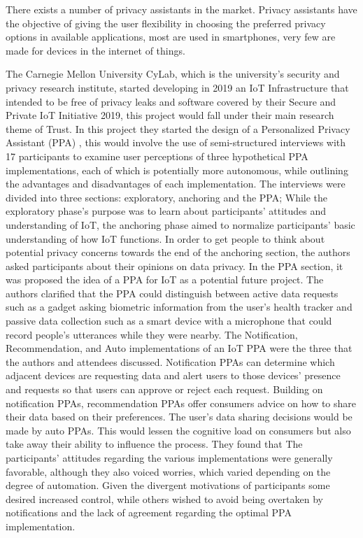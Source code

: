 \documentclass[conference]{IEEEtran}
\begin{document}
There exists a number of privacy assistants in the market. Privacy assistants
have the objective of giving the user flexibility in choosing the
preferred privacy options in available applications, most are used in
smartphones, very few are made for devices in the internet of things.

The Carnegie Mellon University CyLab, which is the university's security and
privacy research institute, started developing in 2019 an IoT Infrastructure
that intended to be free of privacy leaks and software covered by their
Secure and Private IoT Initiative 2019, this project would fall under their
main research theme of Trust. In this project they started the design of a
Personalized Privacy Assistant (PPA) \cite{ColnagoInforming}, this would involve the use of semi-structured
interviews with 17 participants to examine user perceptions of three hypothetical
PPA implementations, each of which is potentially more autonomous,
while outlining the advantages and disadvantages of each implementation.
The interviews were divided into three sections: exploratory, anchoring and the PPA;
While the exploratory phase's purpose was to learn about participants' attitudes
and understanding of IoT, the anchoring phase aimed to normalize participants' basic
understanding of how IoT functions. In order to get people to think about potential
privacy concerns towards the end of the anchoring section, the authors asked
participants about their opinions on data privacy. In the PPA section, it was proposed
the idea of a PPA for IoT as a potential future project. The authors clarified that
the PPA could distinguish between active data requests such as a gadget asking
biometric information from the user's health tracker and passive data collection
such as a smart device with a microphone that could record people's utterances
while they were nearby. The Notification, Recommendation, and Auto implementations
of an IoT PPA were the three that the authors and attendees discussed.
Notification PPAs can determine which adjacent devices are requesting data
and alert users to those devices' presence and requests so that users can
approve or reject each request.
Building on notification PPAs, recommendation PPAs offer consumers advice
on how to share their data based on their preferences.
The user's data sharing decisions would be made by auto PPAs. This would
lessen the cognitive load on consumers but also take away their ability to
influence the process.
They found that The participants' attitudes regarding the various implementations
were generally favorable, although they also voiced worries, which varied
depending on the degree of automation. Given the divergent motivations of
participants some desired increased control, while others wished to avoid
being overtaken by notifications and the lack of agreement regarding the
optimal PPA implementation.
\end{document}
